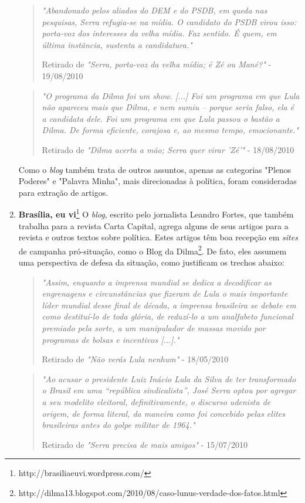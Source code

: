 \begin{enumerate}
\begin{quote}

\emph{"Abandonado pelos aliados do DEM e do PSDB, em queda nas pesquisas, Serra refugia-se na mídia. O candidato do PSDB virou isso: porta-voz dos interesses da velha mídia. Faz sentido. É quem, em última instância, sustenta a candidatura."}

{\small Retirado de \emph{"Serra, porta-voz da velha mídia; é Zé ou Mané?"} - 19/08/2010}
\end{quote}

\begin{quote}
\emph{"O programa da Dilma foi um show. [...] Foi um programa em que Lula não apareceu mais que Dilma, e nem sumiu – porque seria falso, ela é a candidata dele. Foi um programa em que Lula passou o bastão a Dilma. De forma eficiente, corajosa e, ao mesmo tempo, emocionante."}

{\small Retirado de \emph{"Dilma acerta a mão; Serra quer virar 'Zé'"} - 18/08/2010}

\end{quote}

Como o \emph{blog} também trata de outros assuntos, apenas as categorias "Plenos Poderes" e "Palavra Minha", mais direcionadas à política, foram consideradas para extração de artigos.

\item \textbf{Brasília, eu vi}\footnote{http://brasiliaeuvi.wordpress.com/} O \emph{blog}, escrito pelo jornalista Leandro Fortes, que também trabalha para a revista Carta Capital, agrega alguns de seus artigos para a revista e outros textos sobre política. Estes artigos têm boa recepção em \emph{sites} de campanha pró-situação, como o Blog da Dilma\footnote{http://dilma13.blogspot.com/2010/08/caso-lunus-verdade-dos-fatos.html}. De fato, eles assumem uma perspectiva de defesa da situação, como justificam os trechos abaixo:


\begin{quote}
\emph{"Assim, enquanto a imprensa mundial se dedica a decodificar as engrenagens e circunstâncias que fizeram de Lula o mais importante líder mundial desse final de década, a imprensa brasileira se debate em como destituí-lo de toda glória, de reduzí-lo a um analfabeto funcional premiado pela sorte, a um manipulador de massas movido por programas de bolsas e incentivos [...]."}

{\small Retirado de \emph{"Não verás Lula nenhum"} - 18/05/2010}
\end{quote}

\begin{quote}

\emph{"Ao acusar o presidente Luiz Inácio Lula da Silva de ter transformado o Brasil em uma “república sindicalista”, José Serra optou por agregar a seu modelito eleitoral, definitivamente, o discurso udenista de origem, de forma literal, da maneira como foi concebido pelas elites brasileiras antes do golpe militar de 1964."}

{\small Retirado de \emph{"Serra precisa de mais amigos"} - 15/07/2010}
\end{quote}
\end{enumerate}


